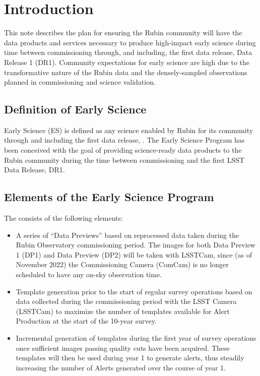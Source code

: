 \section{Introduction}

This note describes the plan for ensuring the Rubin community will have the data products and services necessary to produce high-impact early science during time between commissioning through, and including, the first data release, Data Release 1 (DR1).
Community expectations for early science are high due to the transformative nature of the Rubin data and the densely-sampled observations planned in commissioning and science validation.

\subsection{Definition of Early Science}  \label{ssec:defn}

Early Science (ES) is defined as any science enabled by Rubin for its community through and including the first data release, \drone.
The Early Science Program has been conceived with the goal of providing science-ready data products to the Rubin community during the time between commissioning and the first LSST Data Release, DR1.

\subsection{Elements of the Early Science Program}

The \esp consists of the following elements:
\begin{itemize}
	\item A series of ``Data Previews'' based on reprocessed data taken during the Rubin Observatory commissioning period.
	The images for both Data Preview 1 (DP1) and Data Preview (DP2) will be taken with LSSTCam, since (as of November 2022) the Commissioning Camera (ComCam) is no longer scheduled to have any on-sky observation time.
	\item Template generation prior to the start of regular survey operations based on data collected during the commissioning period with the LSST Camera (LSSTCam) to maximize the number of templates available for Alert Production at the start of the 10-year survey.
	\item Incremental generation of templates during the first year of survey operations once sufficient images passing quality cuts have been acquired. These templates will then be used during year 1 to generate alerts, thus steadily increasing the number of Alerts generated over the course of year 1.
\end{itemize}

